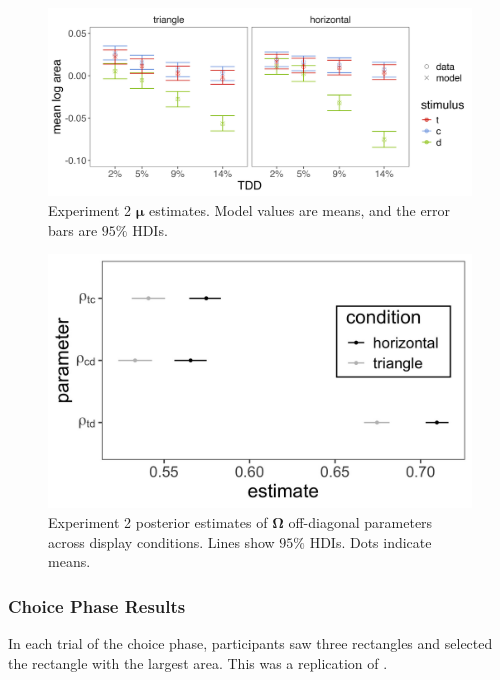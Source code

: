 \begin{figure}
   \centering
   \includegraphics[width=130mm]{figures/bayes_circle_area_mu_sigma_constant_comp_effect_model_v_data_collapsed.jpeg}
   \caption{Experiment 2 $\boldsymbol{\mu}$ estimates. Model values are means, and the error bars are $95\%$ HDIs.}
   \label{fig:e2mu}
\end{figure}

\begin{figure}
   \centering
   \includegraphics[width=130mm]{figures/bayes_circle_area_sigma_constant_comp_effect_omega_plot.jpeg}
   \caption{Experiment 2 posterior estimates of $\boldsymbol{\Omega}$ off-diagonal parameters across display conditions. Lines show $95\%$ HDIs. Dots indicate means.}
   \label{fig:e2_omega}
\end{figure}

\subsubsection{Choice Phase Results}

In each trial of the choice phase, participants saw three rectangles and selected the rectangle with the largest area. This was a replication of \textcite{spektorWhenGoodLooks2018b}.

